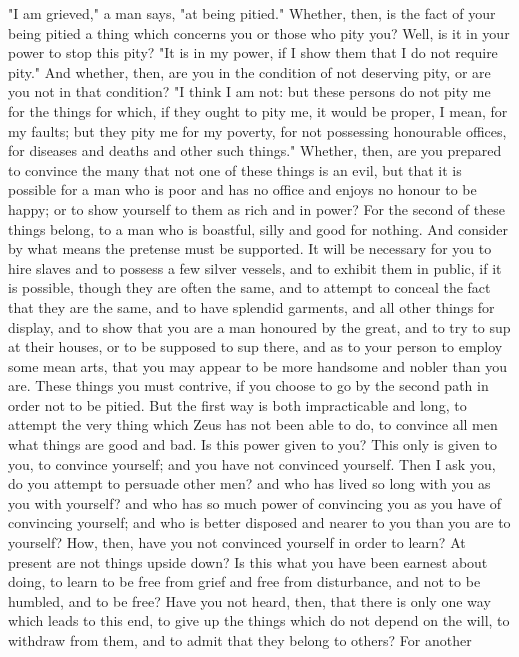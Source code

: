 \documentclass[a4paper]{article}
\begin{document}
    "I am grieved," a man says, "at being pitied." Whether, then, is the fact
of your being pitied a thing which concerns you or those who pity you? Well, is
it in your power to stop this pity? "It is in my power, if I show them that I
do not require pity." And whether, then, are you in the condition of not
deserving pity, or are you not in that condition? "I think I am not: but these
persons do not pity me for the things for which, if they ought to pity me, it
would be proper, I mean, for my faults; but they pity me for my poverty, for
not possessing honourable offices, for diseases and deaths and other such
things." Whether, then, are you prepared to convince the many that not one of
these things is an evil, but that it is possible for a man who is poor and has
no office and enjoys no honour to be happy; or to show yourself to them as rich
and in power? For the second of these things belong, to a man who is boastful,
silly and good for nothing. And consider by what means the pretense must be
supported. It will be necessary for you to hire slaves and to possess a few
silver vessels, and to exhibit them in public, if it is possible, though they
are often the same, and to attempt to conceal the fact that they are the same,
and to have splendid garments, and all other things for display, and to show
that you are a man honoured by the great, and to try to sup at their houses, or
to be supposed to sup there, and as to your person to employ some mean arts,
that you may appear to be more handsome and nobler than you are. These things
you must contrive, if you choose to go by the second path in order not to be
pitied. But the first way is both impracticable and long, to attempt the very
thing which Zeus has not been able to do, to convince all men what things are
good and bad. Is this power given to you? This only is given to you, to
convince yourself; and you have not convinced yourself. Then I ask you, do you
attempt to persuade other men? and who has lived so long with you as you with
yourself? and who has so much power of convincing you as you have of convincing
yourself; and who is better disposed and nearer to you than you are to
yourself? How, then, have you not convinced yourself in order to learn? At
present are not things upside down? Is this what you have been earnest about
doing, to learn to be free from grief and free from disturbance, and not to be
humbled, and to be free? Have you not heard, then, that there is only one way
which leads to this end, to give up the things which do not depend on the will,
to withdraw from them, and to admit that they belong to others? For another
\end{document}
